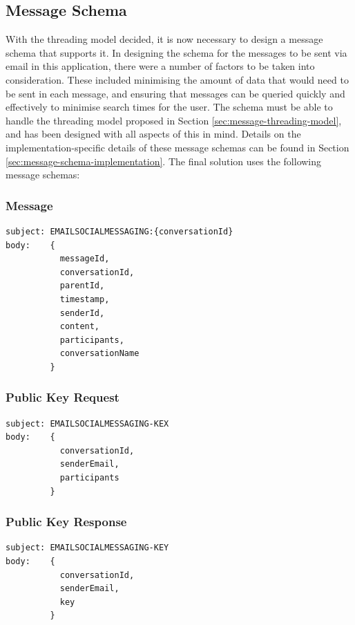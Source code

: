 \subsection{Message Schema} \label{sec:message-schemas}
With the threading model decided, it is now necessary to design a message schema that supports it. In designing the schema for the messages to be sent via email in this application, there were a number of factors to be taken into consideration. These included minimising the amount of data that would need to be sent in each message, and ensuring that messages can be queried quickly and effectively to minimise search times for the user. The schema must be able to handle the threading model proposed in Section \ref{sec:message-threading-model}, and has been designed with all aspects of this in mind. Details on the implementation-specific details of these message schemas can be found in Section \ref{sec:message-schema-implementation}. The final solution uses the following message schemas:

\subsubsection{Message}
\begin{Verbatim}[fontsize=\small]
subject: EMAILSOCIALMESSAGING:{conversationId}
body:    {
           messageId,
           conversationId,
           parentId,
           timestamp,
           senderId,
           content,
           participants,
           conversationName
         }
\end{Verbatim}

\subsubsection{Public Key Request}
\begin{Verbatim}[fontsize=\small]
subject: EMAILSOCIALMESSAGING-KEX
body:    {
           conversationId,
           senderEmail,
           participants
         }
\end{Verbatim}

\subsubsection{Public Key Response}
\begin{Verbatim}[fontsize=\small]
subject: EMAILSOCIALMESSAGING-KEY
body:    {
           conversationId,
           senderEmail,
           key
         }
\end{Verbatim}

